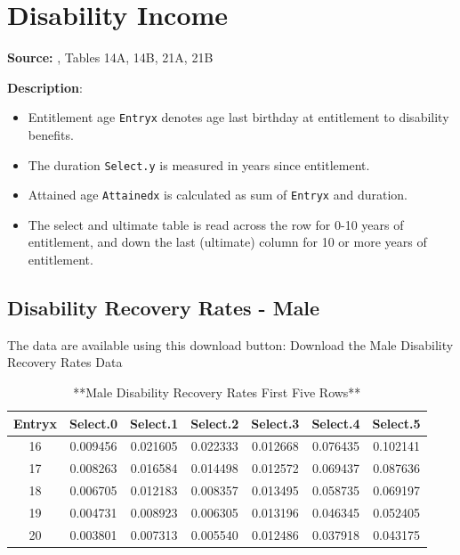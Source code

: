 \documentclass[
]{book}
\providecommand{\tightlist}{%
  \setlength{\itemsep}{0pt}\setlength{\parskip}{0pt}}
\begin{document}
\hypertarget{Sec:DataDisIncome}{%
\section{Disability Income}\label{Sec:DataDisIncome}}

\textbf{Source:} \citet{zayatz2015social}, Tables 14A, 14B, 21A, 21B

\textbf{Description}:

\begin{itemize}
\tightlist
\item
  Entitlement age \texttt{Entryx} denotes age last birthday at entitlement to disability benefits.
\item
  The duration \texttt{Select.y} is measured in years since entitlement.
\item
  Attained age \texttt{Attainedx} is calculated as sum of \texttt{Entryx} and duration.
\item
  The select and ultimate table is read across the row for 0-10 years of entitlement, and down the last (ultimate) column for 10 or more years of entitlement.
\end{itemize}

\hypertarget{disability-recovery-rates---male}{%
\subsection*{Disability Recovery Rates - Male}\label{disability-recovery-rates---male}}

The data are available using this download button:
Download the Male Disability Recovery Rates Data

\begin{table}

\caption{\label{tab:unnamed-chunk-38}**Male Disability Recovery Rates First Five Rows**}
\centering
\begin{tabular}[t]{c|c|c|c|c|c|c}
\hline
Entryx & Select.0 & Select.1 & Select.2 & Select.3 & Select.4 & Select.5\\
\hline
16 & 0.009456 & 0.021605 & 0.022333 & 0.012668 & 0.076435 & 0.102141\\
\hline
17 & 0.008263 & 0.016584 & 0.014498 & 0.012572 & 0.069437 & 0.087636\\
\hline
18 & 0.006705 & 0.012183 & 0.008357 & 0.013495 & 0.058735 & 0.069197\\
\hline
19 & 0.004731 & 0.008923 & 0.006305 & 0.013196 & 0.046345 & 0.052405\\
\hline
20 & 0.003801 & 0.007313 & 0.005540 & 0.012486 & 0.037918 & 0.043175\\
\hline
\end{tabular}
\end{table}
\end{document}
